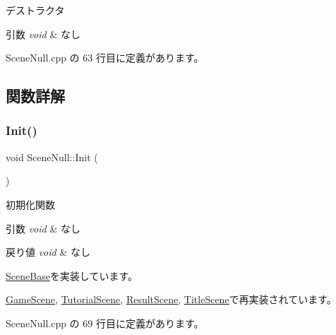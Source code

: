 デストラクタ 


\begin{DoxyParams}{引数}
{\em void} & なし \\
\hline
\end{DoxyParams}


 Scene\+Null.\+cpp の 63 行目に定義があります。



\subsection{関数詳解}
\mbox{\label{class_scene_null_a6b27830a755687f2c00149bcfa739388}} 
\subsubsection{\texorpdfstring{Init()}{Init()}}
{\footnotesize\ttfamily void Scene\+Null\+::\+Init (\begin{DoxyParamCaption}{ }\end{DoxyParamCaption})\hspace{0.3cm}{\ttfamily [virtual]}}



初期化関数 


\begin{DoxyParams}{引数}
{\em void} & なし \\
\hline
\end{DoxyParams}

\begin{DoxyRetVals}{戻り値}
{\em void} & なし \\
\hline
\end{DoxyRetVals}


\mbox{\hyperlink{class_scene_base_a24d7db43c819924dc8b07b436f6d3148}{Scene\+Base}}を実装しています。



\mbox{\hyperlink{class_game_scene_a0ed06e4578a96910725641fb1a74d958}{Game\+Scene}}, \mbox{\hyperlink{class_tutorial_scene_a73023dcc6009590adb942c04631f3294}{Tutorial\+Scene}}, \mbox{\hyperlink{class_result_scene_a222b1c39e96888c43ae2111726576768}{Result\+Scene}}, \mbox{\hyperlink{class_title_scene_a28897f29ffe8725445bc0a27d7a865d1}{Title\+Scene}}で再実装されています。



 Scene\+Null.\+cpp の 69 行目に定義があります。


